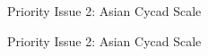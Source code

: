 \documentclass[]{beamer}
\begin{document}
%

\begin{frame}{Priority Issue 2: Asian Cycad Scale}
\end{frame}

\begin{frame}{Priority Issue 2: Asian Cycad Scale}
\end{frame}
\end{document}
